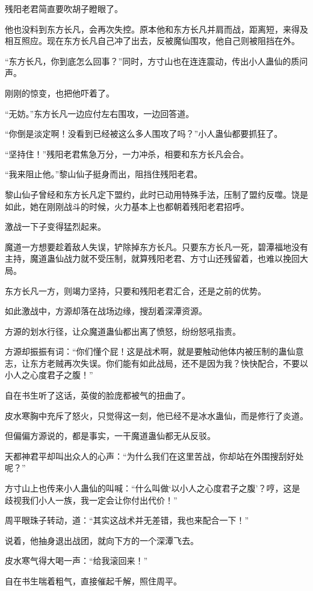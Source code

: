 \begin{this_body}
残阳老君简直要吹胡子瞪眼了。

他也没料到东方长凡，会再次失控。原本他和东方长凡并肩而战，距离短，来得及相互照应。现在东方长凡自己冲了出去，反被魔仙围攻，他自己则被阻挡在外。

“东方长凡，你到底怎么回事？”同时，方寸山也在连连震动，传出小人蛊仙的质问声。

刚刚的惊变，也把他吓着了。

“无妨。”东方长凡一边应付左右围攻，一边回答道。

“你倒是淡定啊！没看到已经被这么多人围攻了吗？”小人蛊仙都要抓狂了。

“坚持住！”残阳老君焦急万分，一力冲杀，相要和东方长凡会合。

“我来阻止他。”黎山仙子挺身而出，阻挡住残阳老君。

黎山仙子曾经和东方长凡定下盟约，此时已动用特殊手法，压制了盟约反噬。饶是如此，她在刚刚战斗的时候，火力基本上也都朝着残阳老君招呼。

激战一下子变得猛烈起来。

魔道一方想要趁着敌人失误，铲除掉东方长凡。只要东方长凡一死，碧潭福地没有主持，魔道蛊仙战力就不受压制，就算残阳老君、方寸山还残留着，也难以挽回大局。

东方长凡一方，则竭力坚持，只要和残阳老君汇合，还是之前的优势。

如此激战中，方源却落在战场边缘，搜刮着深潭资源。

方源的划水行径，让众魔道蛊仙都出离了愤怒，纷纷怒吼指责。

方源却振振有词：“你们懂个屁！这是战术啊，就是要触动他体内被压制的蛊仙意志，让东方老贼再次失误。你们能有如此战局，还不是因为我？快快配合，不要以小人之心度君子之腹！”

自在书生听了这话，英俊的脸庞都被气的扭曲了。

皮水寒胸中充斥了怒火，只觉得这一刻，他已经不是冰水蛊仙，而是修行了炎道。

但偏偏方源说的，都是事实，一干魔道蛊仙都无从反驳。

天都神君平却叫出众人的心声：“为什么我们在这里苦战，你却站在外围搜刮好处呢？”

方寸山上也传来小人蛊仙的叫喊：“什么叫做‘以小人之心度君子之腹’？哼，这是歧视我们小人一族，我一定会让你付出代价！”

周平眼珠子转动，道：“其实这战术并无差错，我也来配合一下！”

说着，他抽身退出战团，就向下方的一个深潭飞去。

皮水寒气得大喝一声：“给我滚回来！”

自在书生喘着粗气，直接催起千解，照住周平。


\end{this_body}
